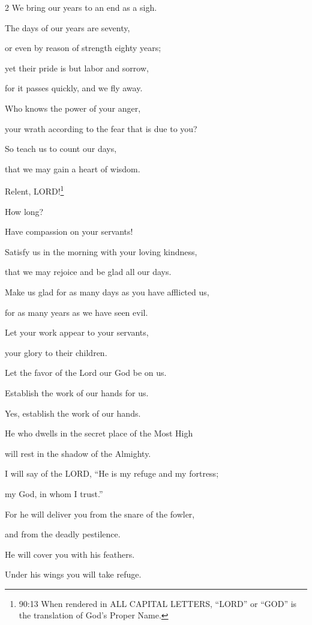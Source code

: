 \begin{multicols}{2}
	We bring our years to an end as a sigh.
	
	
	\myverse{}The days of our years are seventy,
	
	or even by reason of strength eighty years;
	
	yet their pride is but labor and sorrow,
	
	for it passes quickly, and we fly away.
	
	
	\myverse{}Who knows the power of your anger,
	
	your wrath according to the fear that is due to you?
	
	
	\myverse{}So teach us to count our days,
	
	that we may gain a heart of wisdom.
	
	
	\myverse{}Relent, LORD!\footnote{90:13 When rendered in ALL CAPITAL LETTERS, “LORD” or “GOD” is the translation of God’s Proper Name.}
	
	How long?
	
	Have compassion on your servants!
	
	
	\myverse{}Satisfy us in the morning with your loving kindness,
	
	that we may rejoice and be glad all our days.
	
	
	\myverse{}Make us glad for as many days as you have afflicted us,
	
	for as many years as we have seen evil.
	
	
	\myverse{}Let your work appear to your servants,
	
	your glory to their children.
	
	
	\myverse{}Let the favor of the Lord our God be on us.
	
	Establish the work of our hands for us.
	
	Yes, establish the work of our hands.
	
	
	\mychapter{} \myverse*{}He who dwells in the secret place of the Most High
	
	will rest in the shadow of the Almighty.
	
	
	\myverse{}I will say of the LORD, “He is my refuge and my fortress;
	
	my God, in whom I trust.”
	
	
	\myverse{}For he will deliver you from the snare of the fowler,
	
	and from the deadly pestilence.
	
	
	\myverse{}He will cover you with his feathers.
	
	Under his wings you will take refuge.
	

\end{multicols}
